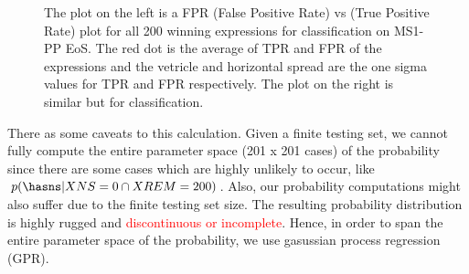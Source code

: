 \begin{figure}[htp]
  \centering
  \quad
  \caption{The plot on the left is a FPR (False Positive Rate) vs (True Positive Rate) plot for all 200 winning expressions for \hasns classification on MS1-PP EoS. The red dot is the average of TPR and FPR of the expressions and the vetricle and horizontal spread are the one sigma values for TPR and FPR respectively. The plot on the right is similar but for \hasrem classification.  }
  \label{fig:FPR_TPR}
\end{figure}

There as some caveats to this calculation. Given a finite testing set, we cannot fully compute the entire parameter space (201 x 201 cases) of the probability since there are some cases which are highly unlikely to occur, like $p(\hasns | XNS=0 \cap XREM=200)$. Also, our probability computations might also suffer due to the finite testing set size. The resulting probability distribution is highly rugged and \textcolor{red}{discontinuous or incomplete}. Hence, in order to span the entire parameter space of the probability, we use gasussian process regression (GPR). 

